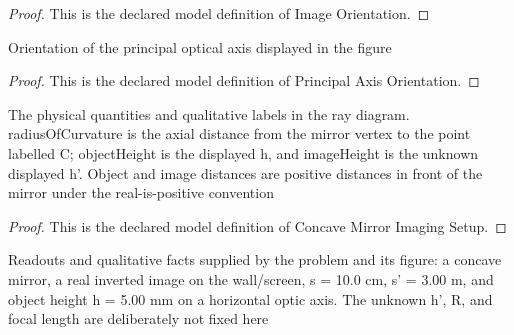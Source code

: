 \begin{proof}
  This is the declared model definition of Image Orientation.
\end{proof}
\begin{definition}
  \label{def:physics:phyx-mini-0038:phyxminiproblems-problemphyxmini0038-principalaxisorientation}
  Orientation of the principal optical axis displayed in the figure
\end{definition}
\begin{proof}
  This is the declared model definition of Principal Axis Orientation.
\end{proof}
\begin{definition}
  \label{def:physics:phyx-mini-0038:phyxminiproblems-problemphyxmini0038-concavemirrorimagingsetup}
  The physical quantities and qualitative labels in the ray diagram. radiusOfCurvature is the axial distance from the mirror vertex to the point labelled C; objectHeight is the displayed h, and imageHeight is the unknown displayed h'. Object and image distances are positive distances in front of the mirror under the real-is-positive convention
\end{definition}
\begin{proof}
  This is the declared model definition of Concave Mirror Imaging Setup.
\end{proof}
\begin{definition}
  \label{def:physics:phyx-mini-0038:phyxminiproblems-problemphyxmini0038-matchesfigurereadouts}
  Readouts and qualitative facts supplied by the problem and its figure: a concave mirror, a real inverted image on the wall/screen, s = 10.0 cm, s' = 3.00 m, and object height h = 5.00 mm on a horizontal optic axis. The unknown h', R, and focal length are deliberately not fixed here
\end{definition}
